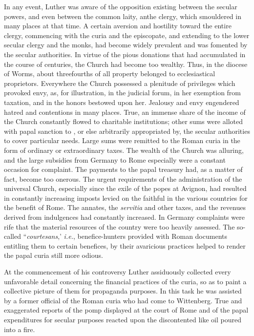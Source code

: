 In any event, Luther was aware of the opposition existing between the
secular powers, and even between the common laity, anthe clergy, which
smouldered in many places at that time. A certain
aversion and hostility toward the entire clergy, commencing with
the curia and the episcopate, and extending to the lower secular
clergy and the monks, had become widely prevalent and was fomented by
the secular authorities. In virtue of the pious donations
that had accumulated in the course of centuries, the Church had
become too wealthy. Thus, in the diocese of Worms, about threefourths
of all property belonged to ecclesiastical proprietors. Everywhere the
Church possessed a plenitude of privileges which provoked
envy, as, for illustration, in the judicial forum, in her exemption
from taxation, and in the honors bestowed upon her. Jealousy and
envy engendered hatred and contentions in many places. True, an
immense share of the income of the Church constantly flowed to
charitable institutions; other sums were alloted with papal sanction to
, or else arbitrarily appropriated by, the secular authorities to
cover particular needs. Large sums were remitted to the Roman
curia in the form of ordinary or extraordinary taxes. The wealth of
the Church was alluring, and the large subsidies from Germany to
Rome especially were a constant occasion for complaint. The payments to
the papal treasury had, as a matter of fact, become too
onerous. The urgent requirements of the administration of the universal
Church, especially since the exile of the popes at Avignon,
had resulted in constantly increasing imposts levied on the faithful in
the various countries for the benefit of Rome. The annates,
the \textit{servitia} and other taxes, and the revenues derived from indulgences
had constantly increased. In Germany complaints were rife that
the material resources of the country were too heavily assessed. The
so-called “\textit{courtesans},’ \textit{i.e.}, benefice-hunters provided with Roman
documents entitling them to certain benefices, by their avaricious
practices helped to render the papal curia still more odious.

At the commencement of his controversy Luther assiduously collected
every unfavorable detail concerning the financial practices
of the curia, so as to paint a collective picture of them for propaganda
purposes. In this task he was assisted by a former official of the
Roman curia who had come to Wittenberg. True and exaggerated
reports of the pomp displayed at the court of Rome and of the papal
expenditures for secular purposes reacted upon the discontented
like oil poured into a fire.

